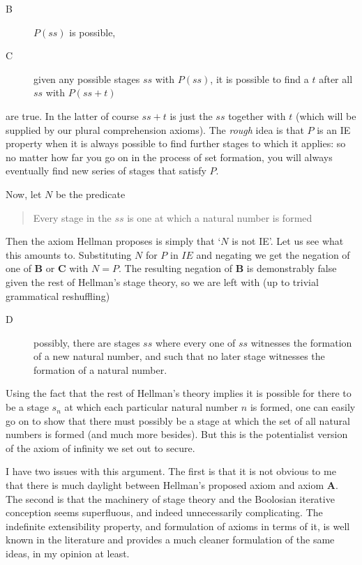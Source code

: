 \documentclass{asl}
\theoremstyle{definition}
\begin{document}
\begin{description} 
    \item[B]    $P(ss)$ is possible,
    \item[C]    given any possible stages $ss$ with $P(ss)$, 
                it is possible to find a $t$ after all $ss$ with $P(ss + t)$
\end{description}
are true. In the latter of course $ss + t$ is just 
the $ss$ together with $t$ (which will be supplied by 
our plural comprehension axioms). The \emph{rough} idea is that $P$ is 
an IE property when it is always possible to find further 
stages to which it applies: so no matter how far you go on 
in the process of set formation, you will always eventually 
find new series of stages that satisfy $P$.

Now, let $N$ be the predicate
\begin{quote} Every stage in the $ss$ is one at which a natural number is formed
\end{quote} 
Then the axiom Hellman proposes is simply that `$N$ is not IE'. 
Let us see what this amounts to. Substituting $N$ for $P$ in $IE$ 
and negating we get the negation of one of {\bf B} or {\bf C} with $N = P$. 
The resulting negation of {\bf B} is demonstrably false 
given the rest of Hellman's stage theory, 
so we are left with (up to trivial grammatical reshuffling)

\begin{description}
    \item[D] possibly, there are stages $ss$ 
    where every one of $ss$ witnesses the formation of a new natural number, 
    and such that no later stage witnesses the formation of a natural number.
\end{description}

Using the fact that the rest of Hellman's theory implies 
it is possible for there to be a stage $s_n$ at which 
each particular natural number $n$ is formed, 
one can easily go on to show that there must possibly be a stage 
at which the set of all natural numbers is formed (and much more besides). 
But this is the potentialist version of the axiom of infinity we set out to secure.

I have two issues with this argument. 
The first is that it is not obvious to me 
that there is much daylight between Hellman's proposed axiom 
and axiom {\bf A}. The second is that the machinery of stage theory 
and the Boolosian iterative conception seems superfluous, 
and indeed unnecessarily complicating. The indefinite extensibility property,
and formulation of axioms in terms of it, is well known in the literature 
and provides a much cleaner formulation of the same ideas, in my opinion at least.
\end{document}
